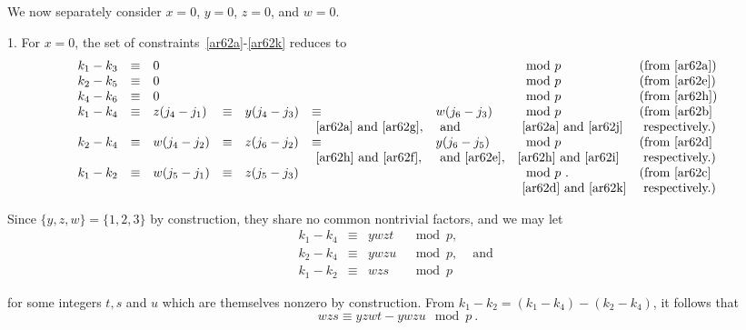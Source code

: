 We now separately consider $x=0$, $y=0$, $z=0$, and $w=0$.

1. For $x=0$, the set of constraints~\eqref{ar62a}-\eqref{ar62k}
reduces to
\begin{equation}\begin{array}{llllllllllll}
k_1-k_3 &\equiv& 0 & {}& {}&{}&{}&\mod p &\text{(from
\eqref{ar62a})}
\\
k_2-k_5 &\equiv& 0 & {}& {}&{}&{}&\mod p&\text{(from \eqref{ar62e})}
\\
k_4-k_6 &\equiv& 0 & {}& {}&{}&{}&\mod p&\text{(from \eqref{ar62h})}
\\ k_1-k_4 &\equiv&
z(j_4-j_1)& \equiv& y(j_4-j_3)& \equiv& w(j_6-j_3) &\mod p&\text{(from \eqref{ar62b}}\\
&{}&{}&{}& {}&\text{ \eqref{ar62a} and \eqref{ar62g}},&\text{ and}
&\text{ \eqref{ar62a} and \eqref{ar62j}}&\text{ respectively.)}
\\
k_2-k_4 &\equiv& w(j_4-j_2) &\equiv&  z(j_6-j_2) &\equiv& y(j_6-j_5)
&\mod p&\text{(from
\eqref{ar62d}}\\
&{}&{}&{}& {}&\text{ \eqref{ar62h} and \eqref{ar62f}},&\text{
and{}{} \eqref{ar62e}},&\text{\eqref{ar62h} and
\eqref{ar62i}}&\text{ respectively.)}
\\
k_1-k_2 &\equiv& w(j_5-j_1) &\equiv& z(j_5-j_3) & {}&{}&\mod p~.
&\text{(from \eqref{ar62c}}\\
&{}&{}&{}&{}&{}& {}&\text{ \eqref{ar62d} and \eqref{ar62k}}&\text{
respectively.})
\end{array}\end{equation}

Since $\{y,z,w\}=\{1,2,3\}$ by construction, they share no common
nontrivial factors, and we may let
\begin{equation}\begin{array}{ccccc}k_1-k_4 &\equiv& ywzt &\mod p, &{} \\
k_2-k_4 &\equiv& ywzu &\mod p, &\text{ and }\\k_1-k_2 &\equiv& wzs
&\mod p&{}
\end{array}\end{equation}

for some integers $t,s$ and $u$ which are themselves nonzero by
construction. From $k_1-k_2=(k_1-k_4)-(k_2-k_4)$, it follows that
\begin{equation}\label{eq621}
wzs \equiv yzwt -ywzu \mod p~.
\end{equation}

